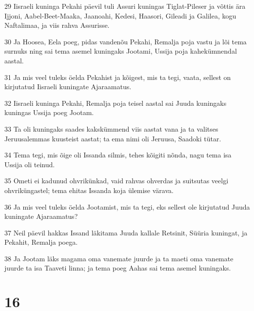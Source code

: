 \par 29 Iisraeli kuninga Pekahi päevil tuli Assuri kuningas Tiglat-Pileser ja võttis ära Ijjoni, Aabel-Beet-Maaka, Jaanoahi, Kedesi, Haasori, Gileadi ja Galilea, kogu Naftalimaa, ja viis rahva Assurisse.
\par 30 Ja Hoosea, Eela poeg, pidas vandenõu Pekahi, Remalja poja vastu ja lõi tema surnuks ning sai tema asemel kuningaks Jootami, Ussija poja kahekümnendal aastal.
\par 31 Ja mis veel tuleks öelda Pekahist ja kõigest, mis ta tegi, vaata, sellest on kirjutatud Iisraeli kuningate Ajaraamatus.
\par 32 Iisraeli kuninga Pekahi, Remalja poja teisel aastal sai Juuda kuningaks kuningas Ussija poeg Jootam.
\par 33 Ta oli kuningaks saades kakskümmend viis aastat vana ja ta valitses Jeruusalemmas kuusteist aastat; ta ema nimi oli Jeruusa, Saadoki tütar.
\par 34 Tema tegi, mis õige oli Issanda silmis, tehes kõigiti nõnda, nagu tema isa Ussija oli teinud.
\par 35 Ometi ei kadunud ohvrikünkad, vaid rahvas ohverdas ja suitsutas veelgi ohvriküngastel; tema ehitas Issanda koja ülemise värava.
\par 36 Ja mis veel tuleks öelda Jootamist, mis ta tegi, eks sellest ole kirjutatud Juuda kuningate Ajaraamatus?
\par 37 Neil päevil hakkas Issand läkitama Juuda kallale Retsinit, Süüria kuningat, ja Pekahit, Remalja poega.
\par 38 Ja Jootam läks magama oma vanemate juurde ja ta maeti oma vanemate juurde ta isa Taaveti linna; ja tema poeg Aahas sai tema asemel kuningaks.

\chapter{16}

